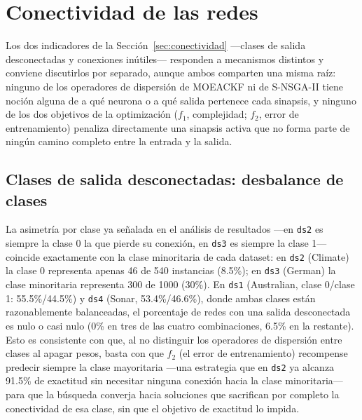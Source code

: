 \section{Conectividad de las redes}
\label{sec:discusion-conectividad-v2}

Los dos indicadores de la Sección~\ref{sec:conectividad} —clases de salida desconectadas y conexiones inútiles— responden a mecanismos distintos y conviene discutirlos por separado, aunque ambos comparten una misma raíz: ninguno de los operadores de dispersión de MOEACKF ni de S-NSGA-II tiene noción alguna de a qué neurona o a qué salida pertenece cada sinapsis, y ninguno de los dos objetivos de la optimización ($f_1$, complejidad; $f_2$, error de entrenamiento) penaliza directamente una sinapsis activa que no forma parte de ningún camino completo entre la entrada y la salida.

\subsection{Clases de salida desconectadas: desbalance de clases}

La asimetría por clase ya señalada en el análisis de resultados —en \texttt{ds2} es siempre la clase 0 la que pierde su conexión, en \texttt{ds3} es siempre la clase 1— coincide exactamente con la clase minoritaria de cada dataset: en \texttt{ds2} (Climate) la clase 0 representa apenas 46 de 540 instancias (8.5\%); en \texttt{ds3} (German) la clase minoritaria representa 300 de 1000 (30\%). En \texttt{ds1} (Australian, clase 0/clase 1: 55.5\%/44.5\%) y \texttt{ds4} (Sonar, 53.4\%/46.6\%), donde ambas clases están razonablemente balanceadas, el porcentaje de redes con una salida desconectada es nulo o casi nulo (0\% en tres de las cuatro combinaciones, 6.5\% en la restante). Esto es consistente con que, al no distinguir los operadores de dispersión entre clases al apagar pesos, basta con que $f_2$ (el error de entrenamiento) recompense predecir siempre la clase mayoritaria —una estrategia que en \texttt{ds2} ya alcanza 91.5\% de exactitud sin necesitar ninguna conexión hacia la clase minoritaria— para que la búsqueda converja hacia soluciones que sacrifican por completo la conectividad de esa clase, sin que el objetivo de exactitud lo impida.

